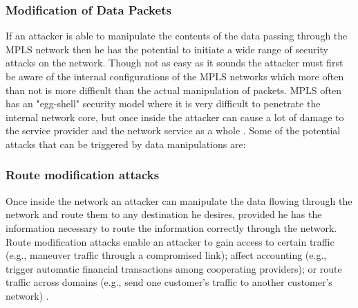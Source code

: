 \subsubsection{Modification of Data Packets}
If an attacker is able to manipulate the contents of the data passing through the MPLS network then he has the potential to initiate a wide range of security attacks on the network. Though not as easy as it sounds the attacker must first be aware of the internal configurations of the MPLS networks which more often than not is more difficult than the actual manipulation of packets. MPLS often has an "egg-shell" security model where it is very difficult to penetrate the internal network core, but once inside the attacker can cause a lot of damage to the service provider and the network service as a whole \cite{grayson2009analysis}. Some of the potential attacks that can be triggered by data manipulations are:

\subsubsection{Route modification attacks}
Once inside the network an attacker can manipulate the data flowing through the network and route them to any destination he desires, provided he has the information necessary to route the information correctly through the network. Route modification attacks enable an attacker to gain access to certain traffic (e.g., maneuver traffic through a compromised link); affect accounting (e.g., trigger automatic financial transactions among cooperating providers); or route traffic across domains (e.g., send one customer’s traffic to another customer’s network) \cite{guernsey2010security}.

